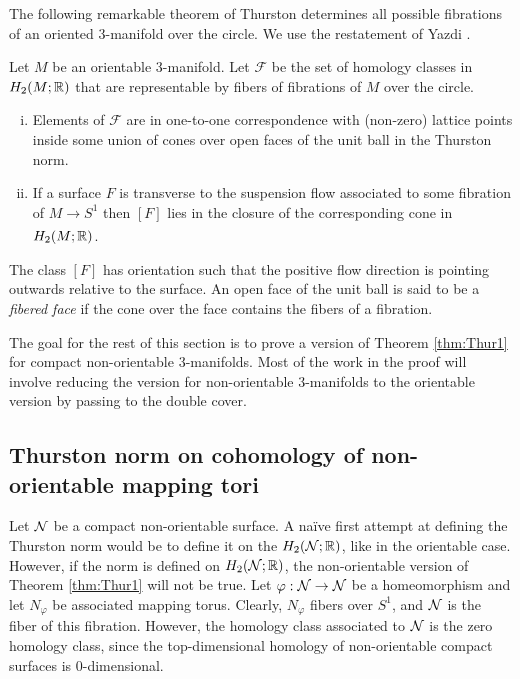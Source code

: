 The following remarkable theorem of Thurston \cite{thurston1986norm} determines all possible fibrations of an oriented 3-manifold over the circle.
We use the restatement of Yazdi \cite{yazdi2018pseudo}.
\begin{thm}[Thurston]
  \label{thm:Thur1}
  Let $M$ be an orientable 3-manifold.  Let $\mathcal{F}$ be the set of homology classes in $H_2(M; \mathbb{R})$ that are representable by fibers of fibrations of $M$ over the circle.
\begin{enumerate}[(i)]
\item Elements of $\mathcal{F}$ are in one-to-one correspondence with (non-zero) lattice points inside some union of cones over open faces of the unit ball in the Thurston norm.
\item If a surface $F$ is transverse to the suspension flow associated to some fibration of
  $M \xrightarrow[]{} S^1$ then $[F]$ lies in the closure of the corresponding cone in $H_2(M;\mathbb{R})$.
\end{enumerate}
\end{thm}
The class $[F]$ has orientation such that the positive flow direction is pointing outwards relative to the surface.
An open face of the unit ball is said to be a \emph{fibered face} if the cone over the face contains the fibers of a fibration.

The goal for the rest of this section is to prove a version of Theorem \ref{thm:Thur1} for compact non-orientable $3$-manifolds.
Most of the work in the proof will involve reducing the version for non-orientable $3$-manifolds to the orientable version by passing to the double cover.

\subsection{Thurston norm on cohomology of non-orientable mapping tori}
\label{sec:thurst-norm-cohom}

Let $\mathcal{N}$ be a compact non-orientable surface.
A na\"ive first attempt at defining the Thurston norm would be to define it on the $H_2(\mathcal{N};\mathbb{R})$, like in the orientable case.
However, if the norm is defined on $H_2(\mathcal{N};\mathbb{R})$, the non-orientable version of Theorem \ref{thm:Thur1} will not be true.
Let $\varphi: \mathcal{N} \to \mathcal{N}$ be a homeomorphism and let $N_{\varphi}$ be associated mapping torus.
Clearly, $N_{\varphi}$ fibers over $S^1$, and $\mathcal{N}$ is the fiber of this fibration.  However, the homology class associated to $\mathcal{N}$ is the zero homology class, since the top-dimensional homology of non-orientable compact surfaces is $0$-dimensional.


